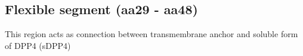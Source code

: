 \subsection{Flexible segment (aa29 - aa48)}

This region acts as connection between transmembrane anchor and soluble form of DPP4 (sDPP4) 

